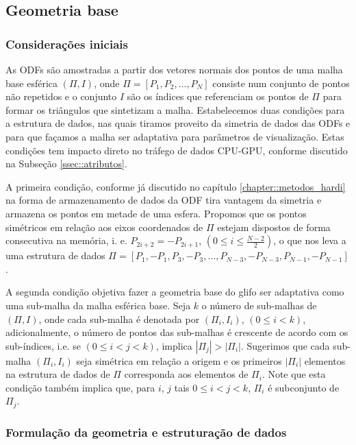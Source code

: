 \documentclass[
    12pt,                %
    oneside,            %
    a4paper,            %
    english,            %
    french,                %
    spanish,            %
    brazil                %
    ]{abntex2}
\begin{document}
\subsection{Geometria base}
\label{ssec::geometria_base}

\subsubsection{Considerações iniciais}

As ODFs são amostradas a partir dos vetores normais dos pontos de uma malha base esférica $(\Pi, I)$, onde $\Pi = [P_1, P_2, \dots, P_N]$ consiste num conjunto de pontos não repetidos e o conjunto $I$ são os índices que referenciam os pontos de $\Pi$ para formar os triângulos que sintetizam a malha. Estabelecemos duas condições para a estrutura de dados, nas quais tiramos proveito da simetria de dados das ODFs e para que façamos a malha ser adaptativa para parâmetros de visualização. Estas condições tem impacto direto no tráfego de dados CPU-GPU, conforme discutido na Subseção \ref{ssec::atributos}.

A primeira condição, conforme já discutido no capítulo \ref{chapter::metodos_hardi} na forma de armazenamento de dados da ODF tira vantagem da simetria e armazena os pontos em metade de uma esfera. Propomos que os pontos simétricos em relação aos eixos coordenados de $\Pi$ estejam dispostos de forma consecutiva na memória, i. e. $P_{2i+2} = -P_{2i+1}$, $(0 \leq i \leq \frac{N-2}{2})$, o que nos leva a uma estrutura de dados $\Pi = [P_1, -P_1, P_3, -P_3, \dots, P_{N-3}, -P_{N-3}, P_{N-1}, -P_{N-1}]$.

A segunda condição objetiva fazer a geometria base do glifo ser adaptativa como uma sub-malha da malha esférica base. Seja $k$ o número de sub-malhas de $(\Pi, I)$, onde cada sub-malha é denotada por $(\Pi_i, I_i)$,  $(0 \leq i < k)$, adicionalmente, o número de pontos das sub-malhas é crescente de acordo com os sub-índices, i.e. se $(0 \leq i < j < k)$, implica $|\Pi_j| > |\Pi_i|$. Sugerimos que cada sub-malha $(\Pi_i, I_i)$ seja simétrica em relação a origem e os primeiros $|\Pi_i|$ elementos na estrutura de dados de $\Pi$ corresponda aos elementos de $\Pi_i$. Note que esta condição também implica que, para $i$, $j$ tais $0 \leq i < j < k$, $\Pi_i$ é subconjunto de $\Pi_j$.

\subsubsection{Formulação da geometria e estruturação de dados}
\label{sssec::formulação_da_geometria_e_estruturação_de_dados}
\end{document}
